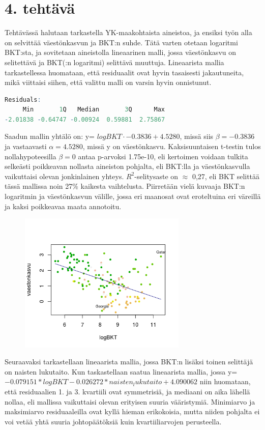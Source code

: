 \documentclass[a4paper]{article}
\begin{document}
\section*{4. tehtävä}
Tehtävässä halutaan tarkastella YK-maakohtaista aineistoa, ja ensiksi työn alla on selvittää väestönkasvun ja BKT:n suhde. Tätä varten otetaan logaritmi BKT:sta, ja sovitetaan aineistolla lineaarinen malli, jossa väestönkasvu on selitettävä ja BKT(:n logaritmi) selittävä muuttuja. 
Lineaarista mallia tarkastellessa huomataan, että residuaalit ovat hyvin tasaisesti jakautuneita, mikä viittaisi siihen, että valittu malli on varsin hyvin onnistunut.
\begin{lstlisting}[language=R]
Residuals:
     Min       1Q   Median       3Q      Max 
-2.01838 -0.64747 -0.00924  0.59881  2.75867 
\end{lstlisting}
Saadun mallin yhtälö on: y= \(logBKT \cdot -0.3836 + 4.5280\), missä siis \(\beta = -0.3836\) ja vastaavasti \(\alpha = 4.5280\), missä y on väestönkasvu. Kaksisuuntaisen t-testin tulos nollahypoteesilla \(\beta = 0\) antaa p-arvoksi 1.75e-10, eli kertoimen voidaan tulkita selkeästi poikkeavan nollasta aineiston pohjalta, eli BKT:lla ja väestönkasvulla vaikuttaisi olevan jonkinlainen yhteys. \(R^2\)-selitysaste on \(\approx\) 0,27, eli BKT selittää tässä mallissa noin 27\% kaikesta vaihtelusta.
Piirretään vielä kuvaaja BKT:n logaritmin ja väestönkasvun välille, jossa eri maanosat ovat eroteltuina eri väreillä ja kaksi poikkeavaa maata annotoitu. 
\begin{figure}[H]
\includegraphics[width=8cm]{2305_4b.png}
\end{figure}
Seuraavaksi tarkastellaan lineaarista mallia, jossa BKT:n lisäksi toinen selittäjä on naisten lukutaito. Kun taskastellaan saatua lineaarista mallia, jossa y= \(-0.079151*logBKT -0.026272*naisten_lukutaito + 4.090062\) niin huomataan, että residuaalien 1. ja 3. kvartiili ovat symmetrisiä, ja mediaani on aika lähellä nollaa, eli mallissa vaikuttaisi olevan erityisen suuria vääristymiä. Minimiarvo ja maksimiarvo residuaaleilla ovat kyllä hieman erikokoisia, mutta niiden pohjalta ei voi vetää yhtä suuria johtopäätöksiä kuin kvartiiliarvojen perusteella.
\end{document}
